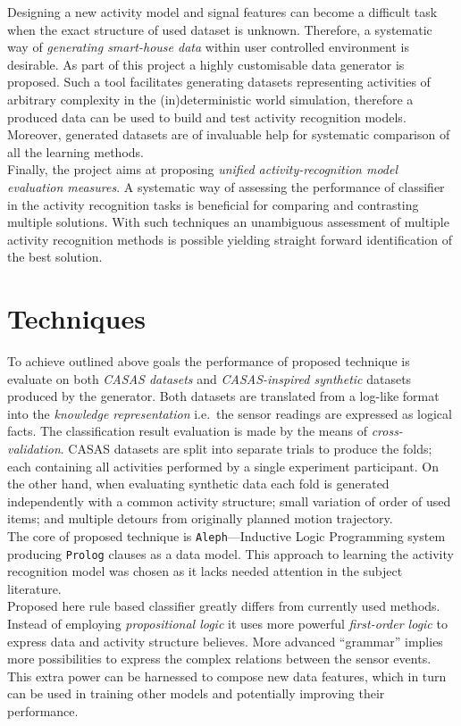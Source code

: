 \documentclass[10pt, a4paper, pdflatex, leqno, twoside, openright]{report}
\begin{document}
Designing a new activity model and signal features can become a difficult task when the exact structure of used dataset is unknown. Therefore, a systematic way of \emph{generating smart-house data} within user controlled environment is desirable. As part of this project a highly customisable data generator is proposed. Such a tool facilitates generating datasets representing activities of arbitrary complexity in the (in)deterministic world simulation, therefore a produced data can be used to build and test activity recognition models. Moreover, generated datasets are of invaluable help for systematic comparison of all the learning methods.\\

Finally, the project aims at proposing \emph{unified activity-recognition model evaluation measures}. A systematic way of assessing the performance of classifier in the activity recognition tasks is beneficial for comparing and contrasting multiple solutions. With such techniques an unambiguous assessment of multiple activity recognition methods is possible yielding straight forward identification of the best solution.

\section{Techniques}
To achieve outlined above goals the performance of proposed technique is evaluate on both \emph{CASAS datasets} and \emph{CASAS-inspired synthetic} datasets produced by the generator. Both datasets are translated from a log-like format into the \emph{knowledge representation} i.e.\ the sensor readings are expressed as logical facts. The classification result evaluation is made by the means of \emph{cross-validation}. CASAS datasets are split into separate trials to produce the folds; each containing all activities performed by a single experiment participant. On the other hand, when evaluating synthetic data each fold is generated independently with a common activity structure; small variation of order of used items; and multiple detours from originally planned motion trajectory.\\

The core of proposed technique is \texttt{Aleph}---Inductive Logic Programming system producing \texttt{Prolog} clauses as a data model. This approach to learning the activity recognition model was chosen as it lacks needed attention in the subject literature.\\
Proposed here rule based classifier greatly differs from currently used methods. Instead of employing \emph{propositional logic} it uses more powerful \emph{first-order logic} to express data and activity structure believes. More advanced ``grammar'' implies more possibilities to express the complex relations between the sensor events. This extra power can be harnessed to compose new data features, which in turn can be used in training other models and potentially improving their performance.\\
\end{document}
